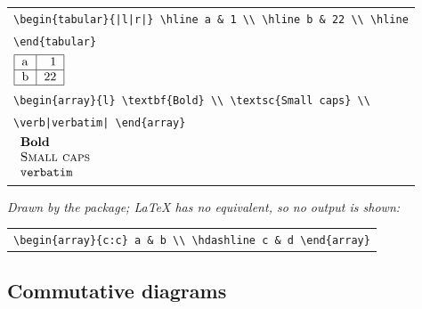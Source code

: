 \documentclass[9pt]{extarticle}
\begin{document}
\begin{tabular}{@{}l@{}}
{\small\verb!\begin{tabular}{|l|r|} \hline a & 1 \\ \hline b & 22 \\ \hline!} \\ {\small\verb|\end{tabular}|} \\ {\large $\begin{tabular}{|l|r|} \hline a & 1 \\ \hline b & 22 \\ \hline \end{tabular}
$} \\[4pt]
{\small\verb|\begin{array}{l} \textbf{Bold} \\ \textsc{Small caps} \\|} \\ {\small\verb!\verb|verbatim| \end{array}!} \\ {\large $\begin{array}{l} \textbf{Bold} \\ \textsc{Small caps} \\ \verb|verbatim| \end{array}
$} \\[4pt]
\end{tabular}

{\small\itshape Drawn by the package; LaTeX has no equivalent, so no output is shown:}

\begin{tabular}{@{}l@{}}
{\small\verb|\begin{array}{c:c} a & b \\ \hdashline c & d \end{array}|} \\
\end{tabular}

\subsection*{Commutative diagrams}
\end{document}
